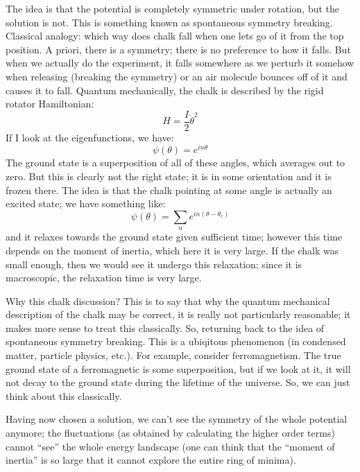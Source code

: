 The idea is that the potential is completely symmetric under rotation, but the solution is not. This is something known as spontaneous symmetry breaking. Classical analogy: which way does chalk fall when one lets go of it from the top position. A priori, there is a symmetry; there is no preference to how it falls. But when we actually do the experiment, it falls somewhere as we perturb it somehow when releasing (breaking the symmetry) or an air molecule bounces off of it and causes it to fall. Quantum mechanically, the chalk is described by the rigid rotator Hamiltonian:
\begin{equation}
    H = \frac{I}{2}\dot{\theta}^2
\end{equation}
If I look at the eigenfunctions, we have:
\begin{equation}
    \psi(\theta) = e^{in\theta}
\end{equation}
The ground state is a superposition of all of these angles, which averages out to zero. But this is clearly not the right state; it is in some orientation and it is frozen there. The idea is that the chalk pointing at some angle is actually an excited state; we have something like:
\begin{equation}
    \psi(\theta) = \sum_n e^{in(\theta - \theta_c)}
\end{equation}
and it relaxes towards the ground state given sufficient time; however this time depends on the moment of inertia, which here it is very large. If the chalk was small enough, then we would see it undergo this relaxation; since it is macroscopic, the relaxation time is very large. 

Why this chalk discussion? This is to say that why the quantum mechanical description of the chalk may be correct, it is really not particularly reasonable; it makes more sense to treat this classically.  So, returning back to the idea of spontaneous symmetry breaking. This is a ubiqitous phenomenon (in condensed matter, particle physics, etc.). For example, consider ferromagnetism. The true ground state of a ferromagnetic is some superposition, but if we look at it, it will not decay to the ground state during the lifetime of the universe. So, we can just think about this classically.

Having now chosen a solution, we can't see the symmetry of the whole potential anymore; the fluctuations (as obtained by calculating the higher order terms) cannot ``see'' the whole energy landscape (one can think that the ``moment of inertia'' is so large that it cannot explore the entire ring of minima).

